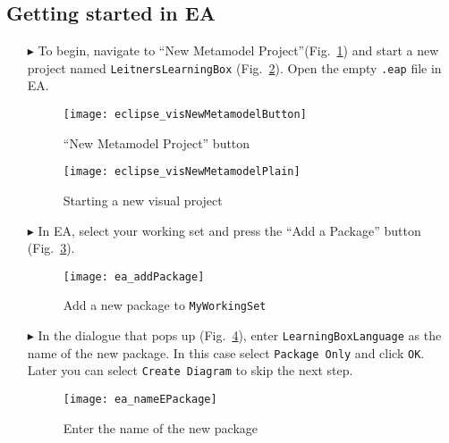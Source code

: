 \newpage
\hypertarget{static:starting vis}{}
\subsection{Getting started in EA}
\genHeader
  
\begin{itemize}

\item[$\blacktriangleright$]  To begin, navigate to ``New Metamodel Project''(Fig.~\ref{eclipse:newVisModelButton}) and start a new project named \texttt{Leit\-ners\-Learn\-ing\-Box} (Fig.~\ref{eclipse:newVisModel}). Open the empty \texttt{.eap} file in EA.

\vspace{0.5cm}

\begin{figure}[htbp]
	\centering
  \texttt{[image: eclipse\_visNewMetamodelButton]}
	\caption{``New Metamodel Project'' button}
	\label{eclipse:newVisModelButton}
\end{figure}
\begin{figure}[htbp]
	\centering
  \texttt{[image: eclipse\_visNewMetamodelPlain]}
	\caption{Starting a new visual project}
	\label{eclipse:newVisModel}
\end{figure}

\vspace{0.5cm}

\item[$\blacktriangleright$] In EA, select your working set and press the ``Add a Package'' button (Fig.~\ref{ea:newPackage}). 

\begin{figure}[htbp]
	\centering
  \texttt{[image: ea\_addPackage]}
	\caption{Add a new package to \texttt{MyWorkingSet}}
	\label{ea:newPackage}
	\vspace{0.5cm}
\end{figure}

\clearpage

\item[$\blacktriangleright$] In the dialogue that pops up (Fig.~\ref{ea:newPackageName}), enter \texttt{LearningBoxLanguage} as the name of the new
package. In this case select \texttt{Package Only} and click \texttt{OK}. Later you can select \texttt{Create Diagram} to skip the next step.

\vspace{0.5cm}

\begin{figure}[htbp]
	\centering
    \texttt{[image: ea\_nameEPackage]}
	\caption{Enter the name of the new package}
	\label{ea:newPackageName}
\end{figure}
\FloatBarrier


\end{itemize}
